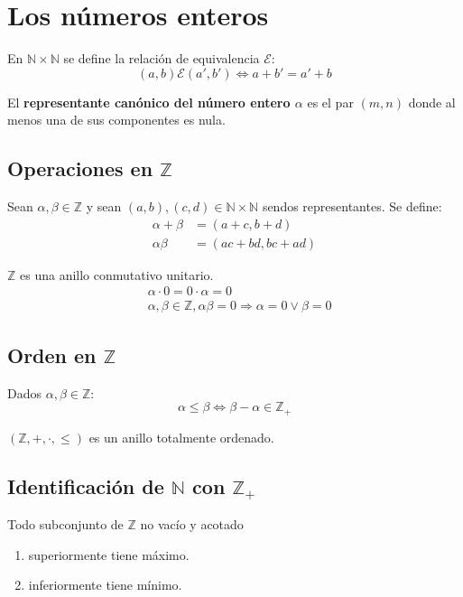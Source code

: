\section{Los números enteros}

En $\mathbb{N} \times \mathbb{N}$ se define la relación de equivalencia $\mathcal{E}$:
\[
(a,b) \mathcal{E} (a',b') \Leftrightarrow a+b'=a'+b
\]

El \textbf{representante canónico del número entero $\alpha$} es el par $(m,n)$ donde al menos una de sus componentes es nula.

\subsection{Operaciones en $\mathbb{Z}$}

Sean $\alpha,\beta \in \mathbb{Z}$ y sean $(a,b),(c,d) \in \mathbb{N} \times \mathbb{N}$ sendos representantes. Se define:
\begin{align*}
\alpha + \beta &= (a+c,b+d) \\
\alpha\beta &= (ac+bd,bc+ad)
\end{align*}

$\mathbb{Z}$ es una anillo conmutativo unitario.
\begin{align*}
&\alpha \cdot 0 = 0 \cdot \alpha = 0 \\
&\alpha, \beta \in \mathbb{Z}, \alpha\beta=0 \Rightarrow \alpha = 0 \vee \beta = 0
\end{align*}

\subsection{Orden en $\mathbb{Z}$}

Dados $\alpha,\beta \in \mathbb{Z}$:
\[
\alpha \leq \beta \Leftrightarrow \beta - \alpha \in \mathbb{Z}_+
\]

$(\mathbb{Z},+,\cdot,\leqslant)$ es un anillo totalmente ordenado.

\subsection{Identificación de $\mathbb{N}$ con $\mathbb{Z}_+$}

Todo subconjunto de $\mathbb{Z}$ no vacío y acotado
\begin{enumerate}
	\item superiormente tiene máximo.
	\item inferiormente tiene mínimo.
\end{enumerate}

